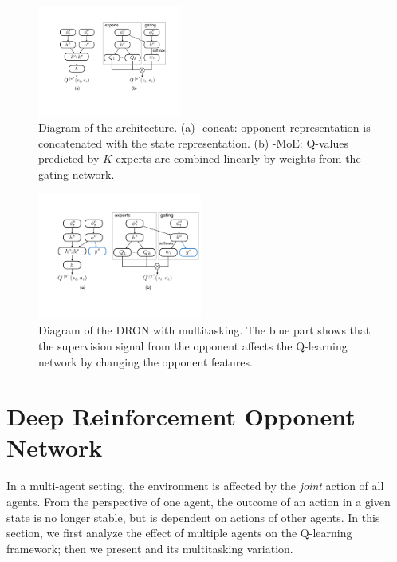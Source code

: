 \begin{figure}[t]
\centering
\includegraphics[width=0.42\textwidth]{2016_icml_opponent/figures/opp_networks}
\caption{Diagram of the \dron{} architecture. (a) \dron{}-concat: opponent representation is concatenated with the state representation.
(b) \dron{}-MoE: Q-values predicted by $K$ experts are combined linearly by weights from the gating network.}
\label{fig:dron}
\end{figure}

\begin{figure}[t]
\centering
\includegraphics[width=0.48\textwidth]{2016_icml_opponent/figures/opp_networks_mt}
\caption{Diagram of the DRON with multitasking. The blue part shows that the supervision signal from the opponent affects the Q-learning network by changing the opponent features.}
\label{fig:dron-mt}
\end{figure}


\section{Deep Reinforcement Opponent Network}
\label{sec:method}

In a multi-agent setting, the environment is affected by the \emph{joint} action
of all agents.  From the perspective of one agent, the outcome of an action in a
given state is no longer stable, but is dependent on actions of other agents.
In this section, we first analyze the effect of multiple agents on the Q-learning framework;
then we present \dron{} and its multitasking variation.

